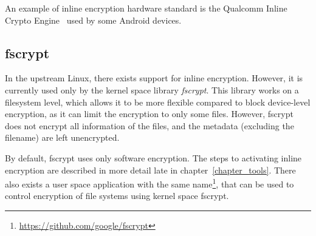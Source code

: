 An example of inline encryption hardware standard is the Qualcomm Inline Crypto Engine~\cite{qualcomm_ice} used by some Android devices.




\subsection{fscrypt}

In the upstream Linux, there exists support for inline encryption. However, it is currently used only by the kernel space library \emph{fscrypt}.
This library works on a filesystem level, which allows it to be more flexible compared to block device-level encryption, as it can limit the encryption to only some files. However, fscrypt does not encrypt all information of the files, and the metadata (excluding the filename) are left unencrypted.

By default, fscrypt uses only software encryption. The steps to activating inline encryption are described in more detail late in chapter~\ref{chapter_tools}.
There also exists a user space application with the same name\footnote{\url{https://github.com/google/fscrypt}}, that can be used to control encryption of file systems using kernel space fscrypt.


